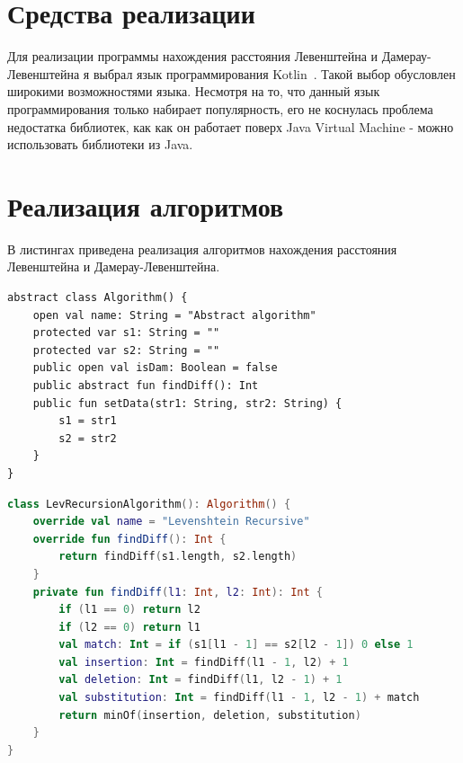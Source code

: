 \documentclass[12pt]{report}
\begin{document}
    \section{Средства реализации}
    Для реализации программы нахождения расстояния Левенштейна и Дамерау-Левенштейна
    я выбрал язык программирования Kotlin~\cite{kotlin}. Такой выбор обусловлен широкими возможностями языка.
    Несмотря на то, что данный язык программирования только набирает популярность, его не коснулась проблема
    недостатка библиотек, как как он работает поверх Java Virtual Machine - можно использовать библиотеки из Java.



    \section{Реализация алгоритмов}
    В листингах приведена реализация алгоритмов нахождения расстояния Левенштейна и Дамерау-Левенштейна.
    \begin{lstlisting}[label={lst:algbase},caption=Базовый класс для всех алгоритмов]
abstract class Algorithm() {
    open val name: String = "Abstract algorithm"
    protected var s1: String = ""
    protected var s2: String = ""
    public open val isDam: Boolean = false
    public abstract fun findDiff(): Int
    public fun setData(str1: String, str2: String) {
        s1 = str1
        s2 = str2
    }
}
    \end{lstlisting}

    \begin{lstlisting}[label={lst:levrecur},caption=Метод для нахождения расстояния Левенштейна рекурсивно,
        language=kotlin]
class LevRecursionAlgorithm(): Algorithm() {
    override val name = "Levenshtein Recursive"
    override fun findDiff(): Int {
        return findDiff(s1.length, s2.length)
    }
    private fun findDiff(l1: Int, l2: Int): Int {
        if (l1 == 0) return l2
        if (l2 == 0) return l1
        val match: Int = if (s1[l1 - 1] == s2[l2 - 1]) 0 else 1
        val insertion: Int = findDiff(l1 - 1, l2) + 1
        val deletion: Int = findDiff(l1, l2 - 1) + 1
        val substitution: Int = findDiff(l1 - 1, l2 - 1) + match
        return minOf(insertion, deletion, substitution)
    }
}
    \end{lstlisting}
\end{document}
